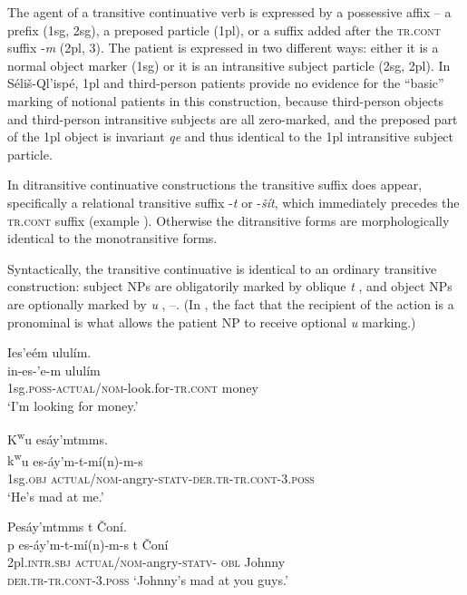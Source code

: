 \documentclass[output=paper,colorlinks,citecolor=brown]{langscibook}
\begin{document}
The agent of a transitive continuative verb is expressed by a
possessive affix -- a prefix (1sg, 2sg), a preposed particle (1pl),
or a suffix added after the \textsc{tr.cont} suffix -\emph{m} (2pl,
3).  The patient is expressed in two different ways: either it is a
normal object marker (1sg) or it is an intransitive subject particle
(2sg, 2pl).  In S\'eli\v{s}-Ql'isp\'e, 1pl and third-person patients
provide no evidence for the ``basic'' marking of notional patients in
this construction, because third-person objects and third-person
intransitive subjects are all zero-marked, and the preposed part of
the 1pl object is invariant \emph{qe} and thus identical to the 1pl
intransitive subject particle.

In ditransitive continuative constructions the transitive suffix does
appear, specifically a relational transitive suffix -\emph{{\textltilde}t} or -\emph{\v{s}\'it}, which immediately precedes the
\textsc{tr.cont} suffix (example ).  Otherwise the ditransitive forms
are morphologically identical to the monotransitive forms.

Syntactically, the transitive continuative is identical to an ordinary
transitive construction: subject NPs are obligatorily marked by
oblique \emph{t} ,  and object NPs are optionally marked by \emph{{\textltilde}u} , --.  (In , the fact that the recipient of
the action is a pronominal is what allows the patient NP to receive
optional \emph{{\textltilde}u} marking.)

\ea 
\label{ex-thomason-24}
Ies{\textcrlambda}'e\textglotstop\'em ulul\'im.  \\
\gll in-es-{\textcrlambda}'e\textglotstop-m ulul\'im \\
1sg.\textsc{poss}-\textsc{actual/nom}-look.for-\textsc{tr.cont} money \\
\glt `I'm looking for money.'
\z

\ea 
\label{ex-thomason-25}
{K\textsuperscript w}u es\'ay'mtmms. \\
\gll  
{k\textsuperscript w}u es-\textrevglotstop\'ay'm-t-m\'i(n)-m-s \\
1sg.\textsc{obj} \textsc{actual/nom}-angry-\textsc{statv-der.tr-tr.cont}-3.\textsc{poss} \\
\glt `He's mad at me.'
\z

\ea 
\label{ex-thomason-26}
Pes\'ay'mtmms t \v{C}on\'i.  \\
\gll p es-\textrevglotstop\'ay'm-t-m\'i(n)-m-s t \v{C}on\'i \\
2pl.\textsc{intr.sbj} \textsc{actual/nom}-angry-\textsc{statv-}
 \textsc{obl} Johnny \\
\textsc{der.tr-tr.cont}-3.\textsc{poss}
\glt `Johnny's mad at you guys.' 
\z
\end{document}

